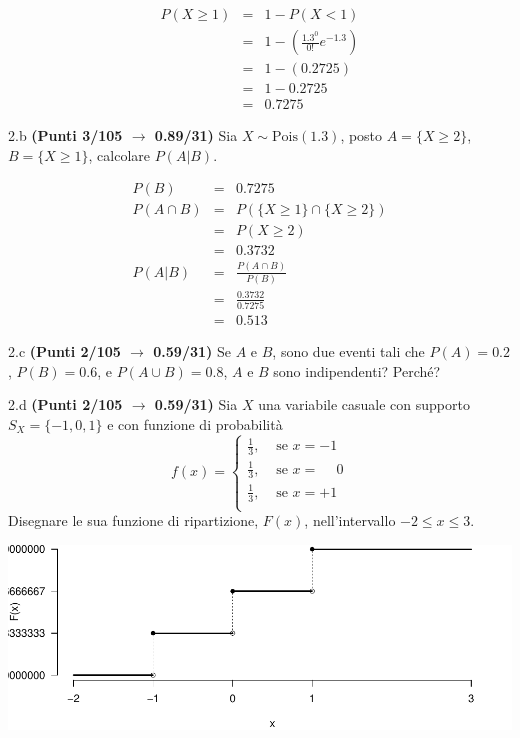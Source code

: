 \documentclass[
  11pt,
]{book}
\theoremstyle{mytheoremstyle}
\theoremstyle{mydefstyle}
\newenvironment{sol}
  {
  \begin{tcolorbox}[enhanced,breakable,arc=0.1mm,boxrule=1pt,colback=white,colframe=iblue,
  title=\bf \fontfamily{lmss}\selectfont \hspace{.5 cm} Soluzione,drop fuzzy shadow]

}{
\end{tcolorbox}
  }
\begin{document}
\begin{sol}
\begin{eqnarray*}
   P( X \geq 1 ) &=& 1-P( X < 1 ) \\                 &=& 1-\left( \frac{ 1.3 ^{ 0 }}{ 0 !}e^{- 1.3 } \right)\\                 &=& 1-( 0.2725 )\\                 &=& 1- 0.2725 \\                 &=&   0.7275 
\end{eqnarray*}

\end{sol}

2.b \textbf{(Punti 3/105 \(\rightarrow\) 0.89/31)} Sia \(X\sim\text{Pois}(1.3)\), posto \(A=\{X\geq 2\}\), \(B=\{X\geq 1\}\), calcolare \(P(A|B)\).

\begin{sol}
\begin{eqnarray*}
  P(B) &=&  0.7275\\
  P(A\cap B) &=& P( \{X \geq 1\} \cap \{X \geq 2\})\\
             &=& P(  X \geq 2)\\
             &=& 0.3732\\
  P(A|B)     &=& \frac{P(A\cap B)}{P(B)}\\
             &=& \frac{0.3732}{0.7275}\\
             &=& 0.513
\end{eqnarray*}

\end{sol}

2.c \textbf{(Punti 2/105 \(\rightarrow\) 0.59/31)} Se \(A\) e \(B\), sono due eventi tali che \(P(A)=0.2\), \(P(B)=0.6\), e \(P(A\cup B)=0.8\), \(A\) e \(B\) sono indipendenti? Perché?

2.d \textbf{(Punti 2/105 \(\rightarrow\) 0.59/31)} Sia \(X\) una variabile casuale con supporto \(S_X=\{-1,0,1\}\) e con funzione di probabilità
\[
f(x)=\begin{cases}
\frac 13, &\text{ se $x=-1$}\\
\frac 13, &\text{ se $x=\phantom{-} 0$}\\
\frac 13, &\text{ se $x=+ 1$}\\
\end{cases}
\]
Disegnare le sua funzione di ripartizione, \(F(x)\), nell'intervallo \(-2\leq x\leq 3\).

\begin{sol}

\begin{center}\includegraphics{Esami_passati_con_soluzioni_files/figure-latex/2024-119-1} \end{center}

\end{sol}
\end{document}
